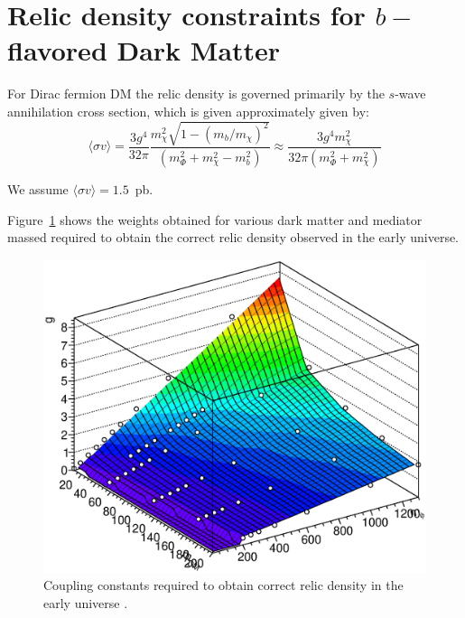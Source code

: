 \section{Relic density constraints for $b-$flavored Dark Matter}
\label{app:Relic_Density_bFDM}

For Dirac fermion DM the relic density is governed primarily by the $s$-wave annihilation cross section, which is given approximately given by:
\begin{equation}
\langle \sigma v \rangle = \frac{3g^4}{32\pi} \frac{m^2_\chi \sqrt{1-(m_b/m_\chi)^2}}{\left( m^2_\Phi+m^2_\chi-m^2_b \right)} \approx \frac{3g^4 m^2_\chi}{32\pi (m^2_\Phi+m^2_\chi)}
\end{equation}

We assume $ \langle \sigma v \rangle=1.5$~pb. 


Figure~\ref{fig:relic_weights} shows the weights obtained for various dark matter and mediator massed required to obtain the correct relic density observed in the early universe.

\begin{figure}[h!]
	\centering 
	\includegraphics[scale=0.5]{figures/bFDM/relic_weights.eps}
	\caption{Coupling constants required to obtain correct relic density in the early universe . \label{fig:relic_weights}}
	\end{figure}	
	
